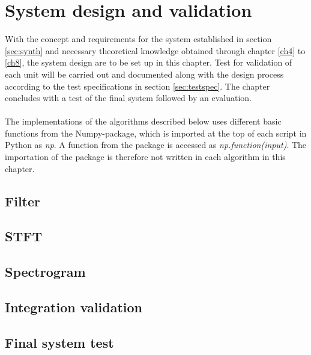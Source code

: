 \chapter{System design and validation} \label{ch10}
With the concept and requirements for the system established in section \ref{sec:synth} and necessary theoretical knowledge obtained through chapter \ref{ch4} to \ref{ch8}, the system design are to be set up in this chapter. Test for validation of each unit will be carried out and documented along with the design process according to the test specifications in section \ref{sec:testspec}. The chapter concludes with a test of the final system followed by an evaluation.
\\ \\
The implementations of the algorithms described below uses different basic functions from the Numpy-package, which is imported at the top of each script in Python as \textit{np}. A function from the package is accessed as \textit{np.function(input)}. The importation of the package is therefore not written in each algorithm in this chapter.



\section{Filter}


\section{STFT}

\section{Spectrogram}

\section{Integration validation}

\section{Final system test}

